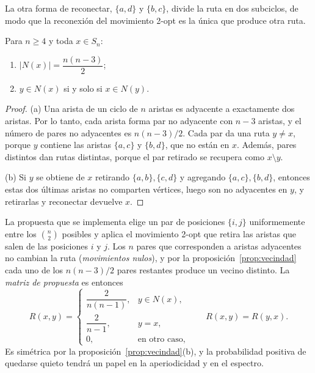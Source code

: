 La otra forma de reconectar, \(\{a,d\}\) y \(\{b,c\}\), divide la ruta en
dos subciclos, de modo que la reconexión del movimiento 2-opt es la
única que produce otra ruta.

\begin{proposicion}
\label{prop:vecindad}
Para \(n\ge 4\) y toda \(x\in S_n\):
\begin{enumerate}[label=(\alph*)]
    \item \(|N(x)|=\dfrac{n(n-3)}{2}\);
    \item \(y\in N(x)\) si y solo si \(x\in N(y)\).
\end{enumerate}
\end{proposicion}

\begin{proof}
(a) Una arista de un ciclo de \(n\) aristas es adyacente a exactamente
dos aristas. Por lo tanto, cada arista forma par no adyacente con
\(n-3\) aristas, y el número de pares no adyacentes es \(n(n-3)/2\).
Cada par da una ruta \(y\ne x\), porque \(y\) contiene las aristas
\(\{a,c\}\) y \(\{b,d\}\), que no están en \(x\). Además, pares distintos
dan rutas distintas, porque el par retirado se recupera como
\(x\setminus y\).

(b) Si \(y\) se obtiene de \(x\) retirando \(\{a,b\},\{c,d\}\) y
agregando \(\{a,c\},\{b,d\}\), entonces estas dos últimas aristas no
comparten vértices, luego son no adyacentes en \(y\), y retirarlas y
reconectar devuelve \(x\).
\end{proof}

La propuesta que se implementa elige un par de posiciones \(\{i,j\}\)
uniformemente entre los \(\binom n2\) posibles y aplica el movimiento
2-opt que retira las aristas que salen de las posiciones \(i\) y \(j\).
Los \(n\) pares que corresponden a aristas adyacentes no cambian la ruta
(\emph{movimientos nulos}), y por la proposición~\ref{prop:vecindad}
cada uno de los \(n(n-3)/2\) pares restantes produce un vecino distinto.
La \emph{matriz de propuesta} es entonces
\begin{equation}
\label{eq:propuesta}
R(x,y)=
\begin{cases}
\dfrac{2}{n(n-1)}, & y\in N(x),\\[1.5ex]
\dfrac{2}{n-1}, & y=x,\\[1ex]
0, & \text{en otro caso},
\end{cases}
\qquad R(x,y)=R(y,x).
\end{equation}
Es simétrica por la proposición~\ref{prop:vecindad}(b), y la
probabilidad positiva de quedarse quieto tendrá un papel en la
aperiodicidad y en el espectro.

